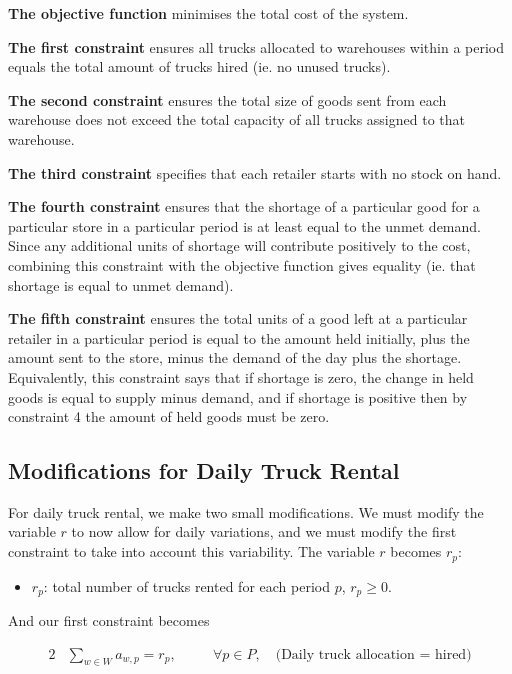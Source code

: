 \documentclass[a4paper,12pt]{article}
\begin{document}
\textbf{The objective function} minimises the total cost of the system.

\textbf{The first constraint} ensures all trucks allocated to warehouses within a period equals the total amount of trucks hired (ie. no unused trucks).

\textbf{The second constraint} ensures the total size of goods sent from each warehouse does not exceed the total capacity of all trucks assigned to that warehouse.

\textbf{The third constraint} specifies that each retailer starts with no stock on hand.

\textbf{The fourth constraint} ensures that the shortage of a particular good for a particular store in a particular period is at least equal to the unmet demand.
Since any additional units of shortage will contribute positively to the cost, combining this constraint with the objective function gives equality (ie. that shortage is equal to unmet demand).

\textbf{The fifth constraint} ensures the total units of a good left at a particular retailer in a particular period is equal to the amount held initially, plus the amount sent to the store, minus the demand of the day plus the shortage.
Equivalently, this constraint says that if shortage is zero, the change in held goods is equal to supply minus demand, and if shortage is positive then by constraint 4 the amount of held goods must be zero.


\subsection{Modifications for Daily Truck Rental}\label{subsec:modifications-for-daily-truck-rental}
For daily truck rental, we make two small modifications.
We must modify the variable $r$ to now allow for daily variations, and we must modify the first constraint to take into account this variability.
The variable $r$ becomes $r_p$:

\begin{itemize}
    \item $r_p$: total number of trucks rented for each period $p$, $r_p \geq 0$.
\end{itemize}

And our first constraint becomes

\begin{alignat}{2}
     & \sum_{w\in W} a_{w,p} = r_p, & \quad & \forall p \in P, \quad \text{(Daily truck allocation = hired)}
\end{alignat}
\end{document}
